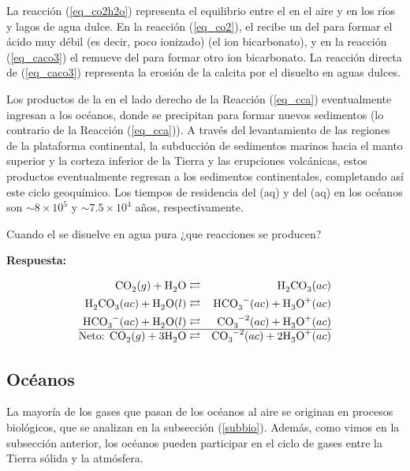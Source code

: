 La reacción (\ref{eq_co2h2o}) representa el equilibrio entre el  en el aire y en los ríos y lagos de agua dulce. En la reacción (\ref{eq_co2}), el  recibe un   del  para formar el ácido muy débil (es decir, poco ionizado)  (el ion bicarbonato), y en la reacción (\ref{eq_caco3}) el  remueve  del  para formar otro ion bicarbonato. La reacción directa de (\ref{eq_caco3}) representa la erosión de la calcita por el   disuelto en aguas dulces.

Los productos de la  en el lado derecho de la Reacción (\ref{eq_cca}) eventualmente ingresan a los océanos, donde se precipitan para formar nuevos sedimentos (lo contrario de la Reacción (\ref{eq_cca})). A través del levantamiento de las regiones de la plataforma continental, la subducción de sedimentos marinos hacia el manto superior y la corteza inferior de la Tierra y las erupciones volcánicas, estos productos eventualmente regresan a los sedimentos continentales, completando así este ciclo geoquímico. Los tiempos de residencia del (aq) y del (aq) en los océanos son $\sim 8\times 10^5$ y $\sim7.5 \times 10^4$ años, respectivamente.

\begin{example}
Cuando el  se disuelve en agua pura ¿que reacciones se producen?

\textbf{Respuesta:}

\begin{footnotesize}
\begin{eqnarray}
\ce{CO2}(g) + \ce{H2O} &\rightleftarrows& \ce{H2CO3}(ac) \\
\ce{H2CO3}(ac) + \ce{H2O}(l) &\rightleftarrows&  \ce{HCO3^-}(ac) + \ce{H3O^+}(ac) \\
 \ce{HCO3^-}(ac) + \ce{H2O}(l) &\rightleftarrows&  \ce{CO3^{-2}}(ac) + \ce{H3O^+}(ac) \\ \hline
 \textrm{Neto:         } \ce{CO2}(g) + 3\ce{H2O} &\rightleftarrows& \ce{CO3^{-2}}(ac) +2 \ce{H3O^+}(ac) 
 \end{eqnarray}
\end{footnotesize}
\end{example}

\subsection{Océanos}
La mayoría de los gases que pasan de los océanos al aire se originan en procesos biológicos, que se analizan en la subsección (\ref{subbio}). Además, como vimos en la subsección anterior, los océanos pueden participar en el ciclo de gases entre la Tierra sólida y la atmósfera. 

